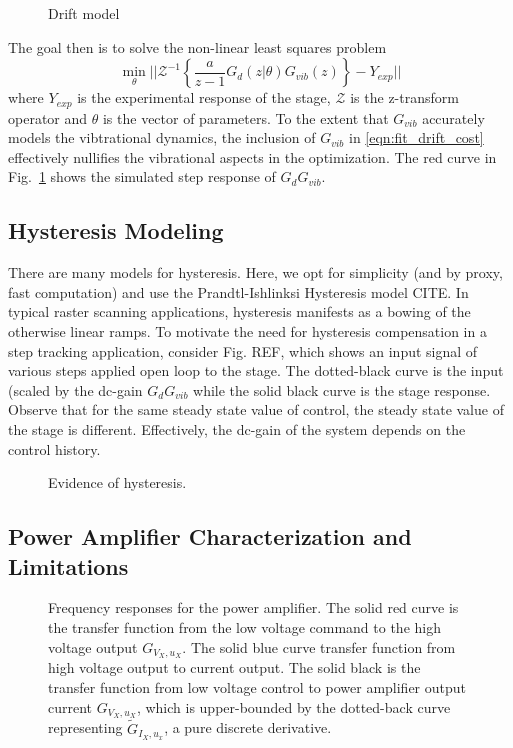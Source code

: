 \documentclass[journal,twocolumn,twoside]{IEEEtran}
\begin{document}
\begin{figure}
  
  \caption{Drift model}
  \label{fig:drift_fit}
\end{figure}
The goal then is to solve the non-linear least squares problem
\begin{equation}
  \min_{\theta}|| \mathcal{Z}^{-1}\left\{ \frac{a}{z-1}G_d(z|\theta)G_{vib}(z)\right\} - Y_{exp}||
\end{equation}
where $Y_{exp}$ is the experimental response of the stage, $\mathcal{Z}$ is the z-transform operator and $\theta$ is the vector of parameters. To the extent that $G_{vib}$ accurately models the vibtrational dynamics, the inclusion of $G_{vib}$ in \eqref{eqn:fit_drift_cost} effectively nullifies the vibrational aspects in the optimization.
The red curve in Fig.~\ref{fig:drift_fit} shows the simulated step response of $G_dG_{vib}$. 


\subsection{Hysteresis Modeling}\label{sec:hyst_model}
There are many models for hysteresis. Here, we opt for simplicity (and by proxy, fast computation) and use the Prandtl-Ishlinksi Hysteresis model CITE. In typical raster scanning applications, hysteresis manifests as a bowing of the otherwise linear ramps. To motivate the need for hysteresis compensation in a step tracking application, consider Fig. REF, which shows an input signal of various steps applied open loop to the stage. The dotted-black curve is the input (scaled by the dc-gain $G_dG_{vib}$ while the solid black curve is the stage response. Observe that for the same steady state value of control, the steady state value of the stage is different. Effectively, the dc-gain of the system depends on the control history.


\begin{figure}
  
  \caption{Evidence of hysteresis.}
  \label{fig:hyst_resp_dem}
\end{figure}


\subsection{Power Amplifier Characterization and Limitations}\label{sec:powcharct}
\begin{figure}[htbp]
\centering

\caption{\label{fig:orgc576458}
  Frequency responses for the power amplifier. The solid red curve is the transfer function from the low voltage command to the high voltage output $G_{V_X, u_X}$. The solid blue curve transfer function from high voltage output to current output. The solid black is the transfer function from low voltage control to power amplifier output current $G_{V_X, u_X}$, which is upper-bounded by the dotted-back curve representing $\tilde G_{I_X, u_x}$, a pure discrete derivative.}
\end{figure}
\end{document}
